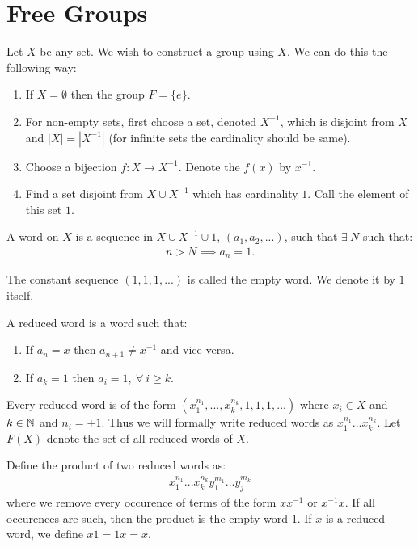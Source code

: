 \section{Free Groups}
Let $X$ be any set. We wish to construct a group using $X$. We can do this the following way:
\begin{enumerate}
  \item If $X = \emptyset$ then the group $F = \{e\}$.
  \item For non-empty sets, first choose a set, denoted $X^{-1}$, which is disjoint from $X$ and $|X| = |X^{-1}|$ (for infinite sets the cardinality should be same).
  \item Choose a bijection $f:X\to X^{-1}$. Denote the $f(x)$ by $x^{-1}$.
  \item Find a set disjoint from $X\cup X^{-1}$ which has cardinality $1$. Call the element of this set $1$.
\end{enumerate}
\begin{definition}
  A word on $X$ is a sequence in $X\cup X^{-1}\cup {1}$, $(a_1,a_2,...)$, such that $\exists\ N$ such that:
  \begin{align*}
    n>N \implies a_n = 1.
  \end{align*}
\end{definition}
\begin{definition}
  The constant sequence $(1,1,1,...)$ is called the empty word. We denote it by $1$ itself.
\end{definition}
\begin{definition}
  A reduced word is a word such that:
  \begin{enumerate}
    \item If $a_n =x$ then $a_{n+1} \neq x^{-1}$ and vice versa.
    \item If $a_k =1$ then $a_i = 1,\ \forall\ i\geq k$.
  \end{enumerate}
\end{definition}
\begin{notation}
  Every reduced word is of the form $(x_1^{n_1},...,x_{k}^{n_k},1,1,1,...)$ where $x_i\in X$ and $k\in \mathbb{N}$ and $n_i = \pm 1$. Thus we will formally write reduced words as $x_1^{n_1}...x_k^{n_k}$. Let $F(X)$ denote the set of all reduced words of $X$.
\end{notation}
\begin{definition}
  Define the product of two reduced words as:
  \begin{align*}
    x_1^{n_1}...x_k^{n_k}y_1^{m_1}...y_j^{m_k}
  \end{align*}
  where we remove every occurence of terms of the form $xx^{-1}$ or $x^{-1}x$. If all occurences are such, then the product is the empty word $1$. If $x$ is a reduced word, we define $x1 = 1x = x$.
\end{definition}
